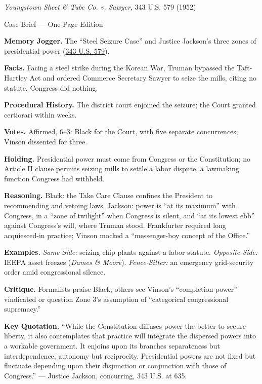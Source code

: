 \documentclass[12pt]{article}
\begin{document}
\begin{center}
{\Large \textit{Youngstown Sheet \& Tube Co. v. Sawyer}, 343 U.S. 579 (1952)\par}
\vspace{0.3em}
{\normalsize Case Brief --- One-Page Edition\par}
\end{center}

\textbf{Memory Jogger.} The ``Steel Seizure Case'' and Justice Jackson's three zones of presidential power (\href{https://supreme.justia.com/cases/federal/us/343/579/}{343 U.S. 579}).

\textbf{Facts.} Facing a steel strike during the Korean War, Truman bypassed the Taft-Hartley Act and ordered Commerce Secretary Sawyer to seize the mills, citing no statute. Congress did nothing.

\textbf{Procedural History.} The district court enjoined the seizure; the Court granted certiorari within weeks.

\textbf{Votes.} Affirmed, 6--3: Black for the Court, with five separate concurrences; Vinson dissented for three.

\textbf{Holding.} Presidential power must come from Congress or the Constitution; no Article II clause permits seizing mills to settle a labor dispute, a lawmaking function Congress had withheld.

\textbf{Reasoning.} Black: the Take Care Clause confines the President to recommending and vetoing laws. Jackson: power is ``at its maximum'' with Congress, in a ``zone of twilight'' when Congress is silent, and ``at its lowest ebb'' against Congress's will, where Truman stood. Frankfurter required long acquiesced-in practice; Vinson mocked a ``messenger-boy concept of the Office.''

\textbf{Examples.} \emph{Same-Side:} seizing chip plants against a labor statute. \emph{Opposite-Side:} IEEPA asset freezes (\textit{Dames \& Moore}). \emph{Fence-Sitter:} an emergency grid-security order amid congressional silence.

\textbf{Critique.} Formalists praise Black; others see Vinson's ``completion power'' vindicated or question Zone 3's assumption of ``categorical congressional supremacy.''

\textbf{Key Quotation.} ``While the Constitution diffuses power the better to secure liberty, it also contemplates that practice will integrate the dispersed powers into a workable government. It enjoins upon its branches separateness but interdependence, autonomy but reciprocity. Presidential powers are not fixed but fluctuate depending upon their disjunction or conjunction with those of Congress.'' --- Justice Jackson, concurring, 343 U.S. at 635.
\end{document}
